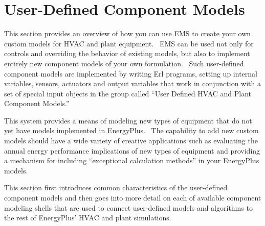 \chapter{User-Defined Component Models}\label{user-defined-component-models}

This section provides an overview of how you can use EMS to create your own custom models for HVAC and plant equipment.~ EMS can be used not only for controls and overriding the behavior of existing models, but also to implement entirely new component models of your own formulation.~ Such user-defined component models are implemented by writing Erl programs, setting up internal variables, sensors, actuators and output variables that work in conjunction with a set of special input objects in the group called ``User Defined HVAC and Plant Component Models.''

This system provides a means of modeling new types of equipment that do not yet have models implemented in EnergyPlus.~ The capability to add new custom models should have a wide variety of creative applications such as evaluating the annual energy performance implications of new types of equipment and providing a mechanism for including ``exceptional calculation methods'' in your EnergyPlus models.

This section first introduces common characteristics of the user-defined component models and then goes into more detail on each of available component modeling shells that are used to connect user-defined models and algorithms to the rest of EnergyPlus' HVAC and plant simulations.
